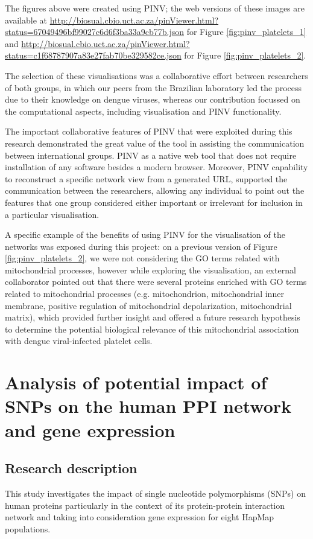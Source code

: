 The figures above were created using PINV; the web versions of these images are available at \url{http://biosual.cbio.uct.ac.za/pinViewer.html?status=67049496bf99027c6d6f3ba33a9cb77b.json} for Figure \ref{fig:pinv_platelets_1} and \url{http://biosual.cbio.uct.ac.za/pinViewer.html?status=c1f68787907a83e27fab70be329582ce.json} for Figure \ref{fig:pinv_platelets_2}.

The selection of these visualisations was a collaborative effort between researchers of both groups, in which our peers from the Brazilian laboratory led the process due to their knowledge on dengue viruses, whereas our contribution focussed on the computational aspects, including visualisation and PINV functionality.

The important collaborative features of PINV that were exploited during this research demonstrated the great value of the tool in assisting the communication between international groups. PINV as a native web tool that does not require installation of any software besides a modern browser. Moreover, PINV capability to reconstruct a specific network view from a generated URL, supported the communication between the researchers, allowing any individual to point out the features that one group considered either important or irrelevant for inclusion in a particular visualisation.

A specific example of the benefits of using PINV for the visualisation of the networks was exposed during this project: on a previous version of Figure \ref{fig:pinv_platelets_2}, we were not considering the GO terms related with mitochondrial processes, however while exploring the visualisation, an external collaborator pointed out that there were several proteins enriched with GO terms related to mitochondrial processes (e.g. mitochondrion, mitochondrial inner membrane, positive regulation of mitochondrial depolarization, mitochondrial matrix), which provided further insight and offered a future research hypothesis to determine the potential biological relevance of this mitochondrial association with dengue viral-infected platelet cells.

\section{Analysis of potential impact of SNPs on the human PPI network and gene expression}
\label{sec:pop_genetics}
\subsection{Research description}
This study investigates the impact of single nucleotide polymorphisms (SNPs) on human proteins particularly in the context of its protein-protein interaction network and taking into consideration gene expression for eight HapMap populations.

